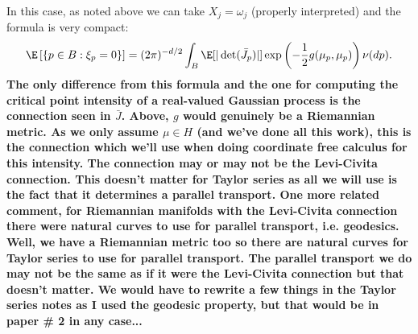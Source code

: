 \documentclass{article}
\begin{document}
In this case, as noted above we can take $X_j=\omega_j$ (properly interpreted) and the
formula is very compact:
$$
\begin{aligned}
\E \left[\{p \in B: \xi_p=0\} \right] &= (2\pi)^{-d/2} \int_{B} \E[|\det(\bar{J}_p)|]  \exp\left(-\frac{1}{2} g(\mu_{p}, \mu_{p}) \right) \nu(dp). \\
\end{aligned}
$$
{\bf 
The only difference from this formula and the one for computing
the critical point intensity of a real-valued Gaussian process is the connection seen in $\bar{J}$. Above,
$g$ would genuinely be a Riemannian metric. As we only assume $\mu \in H$ (and we've done all this work), this is
the connection which we'll use when doing coordinate free calculus for this intensity. The connection
may or may not be the Levi-Civita connection. This doesn't matter for Taylor series as all we will use is the
fact that it determines a parallel transport. One more related comment, for Riemannian manifolds with
the Levi-Civita connection there were natural curves to use for parallel transport, i.e. geodesics. Well,
we have a Riemannian metric too so there are natural curves for Taylor series to use for parallel transport. The parallel transport we do may not be the same as if it were the Levi-Civita connection but that doesn't matter. We would have to rewrite a few things in the Taylor series notes as I used the geodesic property, but that would be in paper \# 2 in any case...
}
\end{document}
